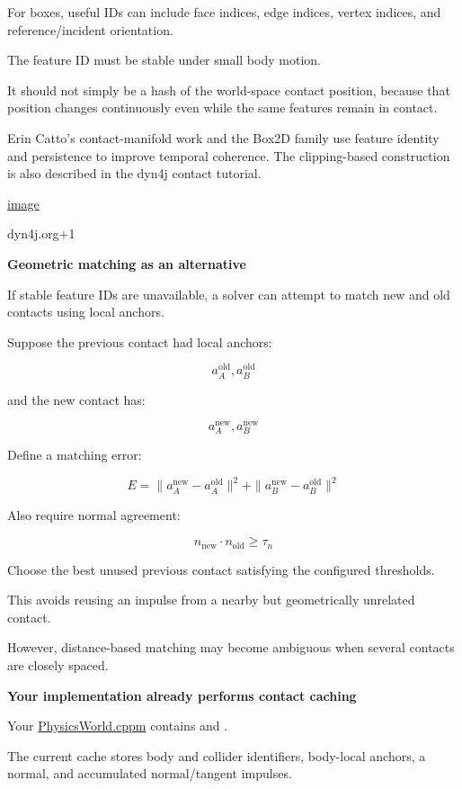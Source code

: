 For boxes, useful IDs can include face indices, edge indices, vertex indices, and reference/incident orientation.

The feature ID must be stable under small body motion.

It should not simply be a hash of the world-space contact position, because that position changes continuously even while the same features remain in contact.

Erin Catto's contact-manifold work and the Box2D family use feature identity and persistence to improve temporal coherence. The clipping-based construction is also described in the dyn4j contact tutorial. 

\href{https://www.google.com/s2/favicons?domain=https://dyn4j.org&sz=32}{image}

dyn4j.org+1

\textbf{Geometric matching as an alternative}

If stable feature IDs are unavailable, a solver can attempt to match new and old contacts using local anchors.

Suppose the previous contact had local anchors:

\[
a_A^{\mathrm{old}},a_B^{\mathrm{old}}
\]

and the new contact has:

\[
a_A^{\mathrm{new}},a_B^{\mathrm{new}}
\]

Define a matching error:

\[
\boxed{ E= \|a_A^{\mathrm{new}}-a_A^{\mathrm{old}}\|^2+ \|a_B^{\mathrm{new}}-a_B^{\mathrm{old}}\|^2 }
\]

Also require normal agreement:

\[
\boxed{ n_{\mathrm{new}}\cdot n_{\mathrm{old}}\ge\tau_n }
\]

Choose the best unused previous contact satisfying the configured thresholds.

This avoids reusing an impulse from a nearby but geometrically unrelated contact.

However, distance-based matching may become ambiguous when several contacts are closely spaced.

\textbf{Your implementation already performs contact caching}

Your \href{https://github.com/swayam8624/KairoPhysicsEngine/blob/main/PhysicsWorld.cppm?utm_source=chatgpt.com}{PhysicsWorld.cppm} contains  and .

The current cache stores body and collider identifiers, body-local anchors, a normal, and accumulated normal/tangent impulses.

